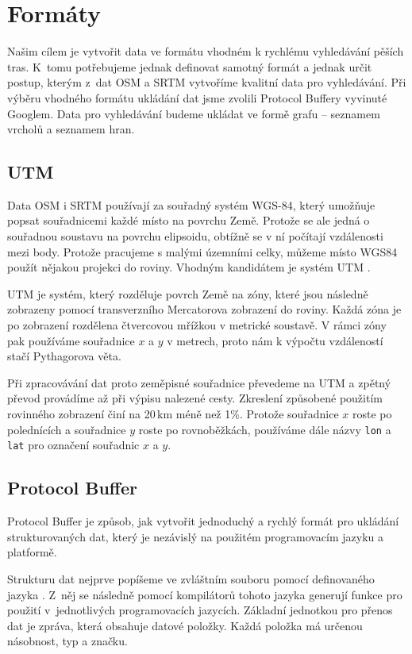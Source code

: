 \chapter{Formáty}
Našim cílem je vytvořit data ve formátu vhodném k rychlému vyhledávání pěších
tras. K~tomu potřebujeme jednak definovat samotný formát a jednak určit postup, kterým z~dat 
OSM a SRTM vytvoříme kvalitní data pro vyhledávání. Při výběru vhodného formátu
ukládání dat jsme zvolili Protocol Buffery \cite{pbfweb} vyvinuté Googlem. Data
pro vyhledávání budeme ukládat ve formě grafu -- seznamem vrcholů a seznamem hran.

\section{UTM}
Data OSM i SRTM používají za souřadný systém WGS-84, který umožňuje popsat
souřadnicemi každé místo na povrchu Země. Protože se ale jedná o souřadnou
soustavu na povrchu elipsoidu, obtížně se v ní počítají vzdálenosti mezi body.
Protože pracujeme s malými územními celky, můžeme místo WGS84 použít nějakou
projekci do roviny. Vhodným kandidátem je systém UTM \cite{utmnorma}.

UTM je systém, který rozděluje povrch Země na zóny, které jsou následně
zobrazeny pomocí transverzního Mercatorova zobrazení do roviny. Každá zóna je po
zobrazení rozdělena čtvercovou mřížkou v metrické soustavě. V rámci zóny pak
používáme souřadnice $x$ a $y$ v metrech, proto nám k výpočtu vzdáleností stačí
Pythagorova věta.

Při zpracovávání dat proto zeměpisné souřadnice převedeme na UTM a zpětný převod
provádíme až při výpisu nalezené cesty. Zkreslení způsobené použitím rovinného
zobrazení činí na 20\,km méně než 1\%. Protože souřadnice $x$ roste po
polednících a souřadnice $y$ roste po rovnoběžkách, používáme dále názvy
\verb|lon| a \verb|lat| pro označení souřadnic $x$ a $y$.

\section{Protocol Buffer}
Protocol Buffer je způsob, jak vytvořit jednoduchý a rychlý formát pro ukládání
strukturovaných dat, který je nezávislý na použitém programovacím jazyku a
platformě. 

Strukturu dat nejprve popíšeme ve zvláštním souboru pomocí definovaného
jazyka \cite{pbfspec}. Z~něj se následně pomocí kompilátorů tohoto jazyka
generují funkce pro použití v~jednotlivých programovacích jazycích. Základní
jednotkou pro přenos dat je zpráva, která obsahuje datové položky. Každá položka
má určenou násobnost, typ a značku.

